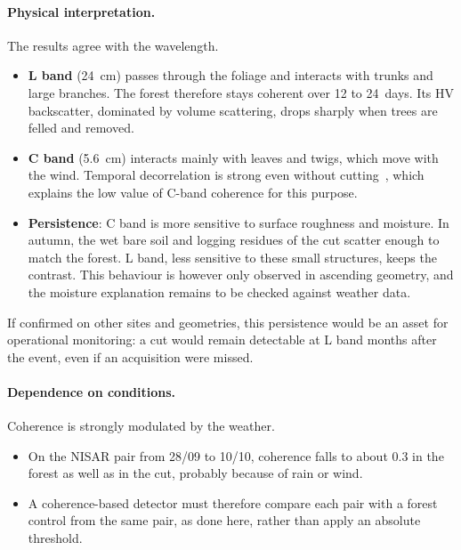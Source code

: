 \documentclass[11pt,a4paper]{article}
\begin{document}
\paragraph{Physical interpretation.} The results agree with the wavelength.
\begin{itemize}
\item \textbf{L band} (24~cm) passes through the foliage and interacts with trunks and large branches. The forest
  therefore stays coherent over 12 to 24~days. Its HV backscatter, dominated by volume scattering, drops sharply
  when trees are felled and removed.
\item \textbf{C band} (5.6~cm) interacts mainly with leaves and twigs, which move with the wind. Temporal
  decorrelation is strong even without cutting~\cite{zebker1992decorrelation}, which explains the low value of C-band
  coherence for this purpose.
\item \textbf{Persistence}: C band is more sensitive to surface roughness and moisture. In autumn, the wet bare soil
  and logging residues of the cut scatter enough to match the forest. L band, less sensitive to these small
  structures, keeps the contrast. This behaviour is however only observed in ascending geometry, and the moisture
  explanation remains to be checked against weather data.
\end{itemize}
If confirmed on other sites and geometries, this persistence would be an asset for operational monitoring: a cut
would remain detectable at L band months after the event, even if an acquisition were missed.

\paragraph{Dependence on conditions.} Coherence is strongly modulated by the weather.
\begin{itemize}
\item On the NISAR pair from 28/09 to 10/10, coherence falls to about 0.3 in the forest as well as in the cut,
  probably because of rain or wind.
\item A coherence-based detector must therefore compare each pair with a forest control from the same pair, as done
  here, rather than apply an absolute threshold.
\end{itemize}
\end{document}
